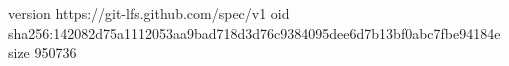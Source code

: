 version https://git-lfs.github.com/spec/v1
oid sha256:142082d75a1112053aa9bad718d3d76c9384095dee6d7b13bf0abc7fbe94184e
size 950736
